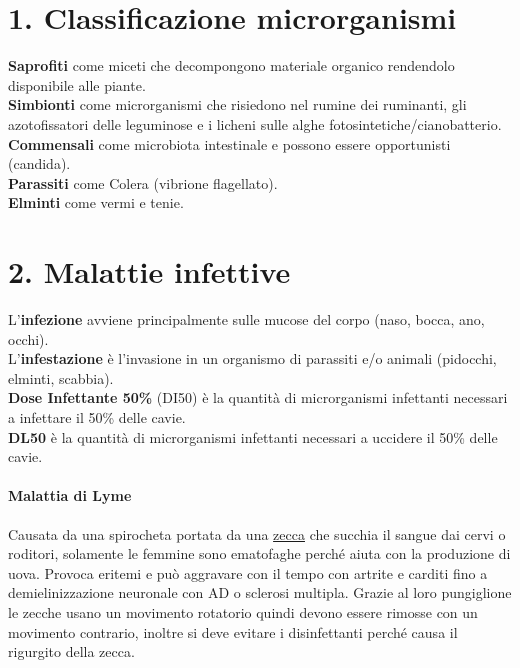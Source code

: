 \documentclass[10pt]{article}
\begin{document}
\section*{1. Classificazione microrganismi}
\textbf{Saprofiti} come miceti che decompongono materiale organico rendendolo disponibile alle piante.\\
\textbf{Simbionti} come microrganismi che risiedono nel rumine dei ruminanti, gli azotofissatori delle leguminose e i licheni sulle alghe fotosintetiche/cianobatterio.\\
\textbf{Commensali} come microbiota intestinale e possono essere opportunisti (candida).\\
\textbf{Parassiti} come Colera (vibrione flagellato).\\
\textbf{Elminti} come vermi e tenie. \\
\section*{2. Malattie infettive}
L'\textbf{infezione} avviene principalmente sulle mucose del corpo (naso, bocca, ano, occhi).\\
L'\textbf{infestazione} è l'invasione in un organismo di parassiti e/o animali (pidocchi, elminti, scabbia).\\
\textbf{Dose Infettante 50\%} (DI50) è la quantità di microrganismi infettanti necessari a infettare il 50\% delle cavie. \\
\textbf{DL50} è la quantità di microrganismi infettanti necessari a uccidere il 50\% delle cavie. \\
\paragraph*{Malattia di Lyme} Causata da una spirocheta portata da una \underline{zecca} che succhia il sangue dai cervi o roditori, solamente le femmine sono ematofaghe perché aiuta con la produzione di uova. Provoca eritemi e può aggravare con il tempo con artrite e carditi fino a demielinizzazione neuronale con AD o sclerosi multipla. Grazie al loro pungiglione le zecche usano un movimento rotatorio quindi devono essere rimosse con un movimento contrario, inoltre si deve evitare i disinfettanti perché causa il rigurgito della zecca. \\
\end{document}
